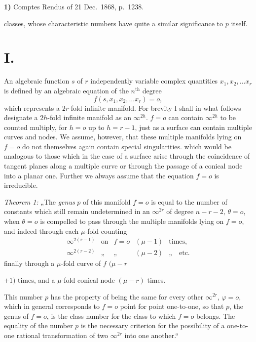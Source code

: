 \documentclass{article}
\begin{document}
\textbf{1)} Comptes Rendus of 21 Dec.\ 1868, p.\ 1238.

classes, whose characteristic numbers have quite a similar significance to $p$ itself.

\section*{I.}

An algebraic function $s$ of $r$ independently variable complex quantities $x_1, x_2, \ldots x_r$ is defined by an algebraic equation of the $n^{\text{th}}$ degree
\[ f(s, x_1, x_2, \ldots x_r) = o, \]
which represents a $2r$-fold infinite manifold. For brevity I shall in what follows designate a $2h$-fold infinite manifold as an $\infty^{2h}$. $f = o$ can contain $\infty^{2h}$ to be counted multiply, for $h = o$ up to $h = r - 1$, just as a surface can contain multiple curves and nodes. We assume, however, that these multiple manifolds lying on $f = o$ do not themselves again contain special singularities. which would be analogous to those which in the case of a surface arise through the coincidence of tangent planes along a multiple curve or through the passage of a conical node into a planar one. Further we always assume that the equation $f = o$ is irreducible.

\emph{Theorem 1:} „The \emph{genus} $p$ of this manifold $f = o$ is equal to the number of constants which still remain undetermined in an $\infty^{2r}$ of degree $n - r - 2$, $\theta = o$, when $\theta = o$ is compelled to pass through the multiple manifolds lying on $f = o$, and indeed through each $\mu$-fold counting
\[
\begin{array}{lllll}
\infty^{2(r-1)} & \text{on} & f = o & (\mu - 1) & \text{times,}\\
\infty^{2(r-2)} & \text{„} & \text{„} & (\mu - 2) & \text{„}\quad\text{etc.}
\end{array}
\]
finally through a $\mu$-fold curve of $f$ $(\mu - r$

$+ 1)$ times, and a $\mu$-fold conical node $(\mu - r)$ times.

This number $p$ has the property of being the same for every other $\infty^{2r}$, $\varphi = o$, which in general corresponds to $f = o$ point for point one-to-one, so that $p$, the genus of $f = o$, is the class number for the class to which $f = o$ belongs. The equality of the number $p$ is the necessary criterion for the possibility of a one-to-one rational transformation of two $\infty^{2r}$ into one another.“
\end{document}
